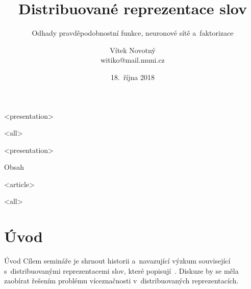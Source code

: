 \title[Distribuované reprezentace]{Distribuované reprezentace slov}
\subtitle{Odhady pravděpodobnostní funkce, neuronové sítě a~faktorizace}
\author[V.\,Novotný]{Vítek Novotný \\ witiko@mail.muni.cz}
\date{18.\ října 2018}
\subject{Distribuované reprezentace polysémních slov}

\begin{frame}[plain]%
\maketitle

\mode
<presentation>


\mode
<all>

\end{frame}


\mode
<presentation>

\begin{frame}{Obsah}
\tableofcontents
\end{frame}

\mode
<article>

\tableofcontents

\mode
<all>

\section{Úvod}

\begin{frame}{Úvod}
Cílem semináře je shrnout historii a~navazující výzkum související
s~distribuovanými reprezentacemi slov, které popisují~\textcite{mikolov13a}.
Diskuze by se měla zaobírat řešením problému víceznačnosti v~distribuovaných
reprezentacích.
\end{frame}


